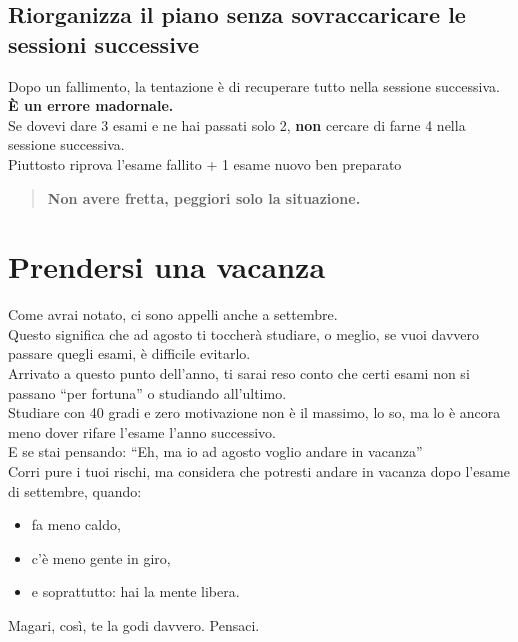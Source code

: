 \documentclass{article}
\begin{document}
\subsection{Riorganizza il piano senza sovraccaricare le sessioni successive}
Dopo un fallimento, la tentazione è di recuperare tutto nella sessione successiva.\\
\textbf{È un errore madornale.}\\
Se dovevi dare 3 esami e ne hai passati solo 2, \textbf{non} cercare di farne 4 nella sessione successiva.\\
Piuttosto riprova l'esame fallito + 1 esame nuovo ben preparato
\begin{quote}
\textbf{Non avere fretta, peggiori solo la situazione.}
\end{quote}


\section{Prendersi una vacanza}
Come avrai notato, ci sono appelli anche a settembre.\\
Questo significa che ad agosto ti toccherà studiare, o meglio, se vuoi davvero passare quegli esami, è difficile evitarlo.\\
Arrivato a questo punto dell'anno, ti sarai reso conto che certi esami non si passano ``per fortuna'' o studiando all'ultimo.\\
Studiare con 40 gradi e zero motivazione non è il massimo, lo so, ma lo è ancora meno dover rifare l'esame l'anno successivo.\\
E se stai pensando: ``Eh, ma io ad agosto voglio andare in vacanza''\\
Corri pure i tuoi rischi, ma considera che potresti andare in vacanza dopo l'esame di settembre, quando:
\begin{itemize}
\item fa meno caldo,
\item c'è meno gente in giro,
\item e soprattutto: hai la mente libera.
\end{itemize}
Magari, così, te la godi davvero. Pensaci.
\end{document}
